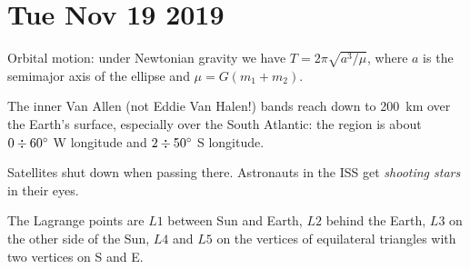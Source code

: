 \documentclass[main.tex]{subfiles}
\begin{document}
\section*{Tue Nov 19 2019}

Orbital motion: under Newtonian gravity we have \(T = 2 \pi \sqrt{a^{3} / \mu }\), where \(a\) is the semimajor axis of the ellipse and \(\mu = G (m_1 + m_2 )\). 

The inner Van Allen (not Eddie Van Halen!) bands reach down to \SI{200}{km} over the Earth's surface, especially over the South Atlantic: the region is about \(0 \divisionsymbol \SI{60}{\degree} \) W longitude and \(2 \divisionsymbol \SI{50}{\degree} \) S longitude. 

Satellites shut down when passing there. Astronauts in the ISS get \emph{shooting stars} in their eyes. 

The Lagrange points are \(L1\) between Sun and Earth, \(L2\) behind the Earth, \(L3\) on the other side of the Sun, \(L4\) and \(L5\) on the vertices of equilateral triangles with two vertices on S and E. 
\end{document}
